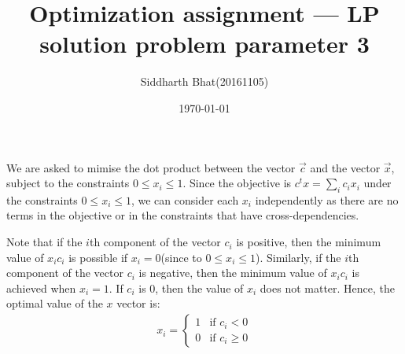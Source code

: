 \documentclass[11pt]{article}
\author{Siddharth Bhat(20161105)}
\title{Optimization assignment --- LP solution problem parameter 3 }
\date{\today}
\begin{document}
\maketitle
\thispagestyle{fancy}
We are asked to mimise the dot product between the vector $\vec c$
and the vector $\vec x$, subject to the constraints $0 \leq x_i \leq 1$. Since
the objective is $c^t x = \sum_i c_i x_i$ under the constraints
$0 \leq x_i \leq 1$, we can consider each $x_i$
independently as there are no terms in the objective or in the constraints that
have cross-dependencies.

Note that if the $i$th component of the vector $c_i$ is positive, then the
minimum value of $x_i c_i$ is possible if $x_i = 0$(since to $0 \leq x_i \leq
1$). Similarly, if the $i$th component of the vector $c_i$ is negative, then
the minimum value of $x_i c_i$ is achieved when $x_i = 1$. If $c_i$ is $0$,
then the value of $x_i$ does not matter. Hence, the optimal value of the $x$
vector is:
\begin{align*}
    x_i = \begin{cases}
        1 & \text{if $c_i < 0$} \\
        0 & \text{if $c_i \geq 0$}
    \end{cases}
\end{align*}
\end{document}
